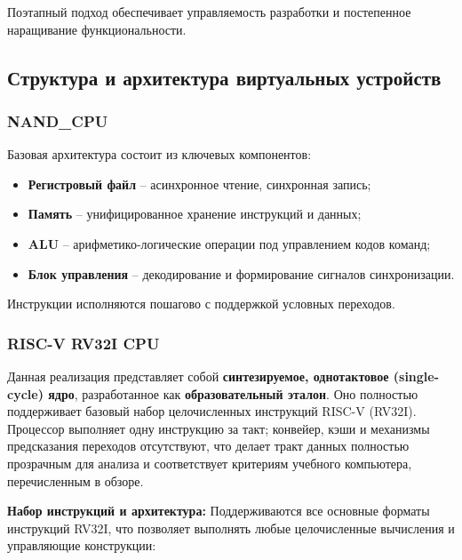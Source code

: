 Поэтапный подход обеспечивает управляемость разработки и постепенное наращивание функциональности.

\subsection{Структура и архитектура виртуальных устройств}

\subsubsection{NAND\_CPU}
Базовая архитектура состоит из ключевых компонентов:
\begin{itemize}
  \item \textbf{Регистровый файл} -- асинхронное чтение, синхронная запись;
  \item \textbf{Память} -- унифицированное хранение инструкций и данных;
  \item \textbf{ALU} -- арифметико-логические операции под управлением кодов команд;
  \item \textbf{Блок управления} -- декодирование и формирование сигналов синхронизации.
\end{itemize}

Инструкции исполняются пошагово с поддержкой условных переходов.

\subsubsection{RISC-V RV32I CPU}
Данная реализация представляет собой \textbf{синтезируемое, однотактовое (single-cycle) ядро}, разработанное как \textbf{образовательный эталон}. Оно полностью поддерживает базовый набор целочисленных инструкций RISC-V (RV32I). Процессор выполняет одну инструкцию за такт; конвейер, кэши и механизмы предсказания переходов отсутствуют, что делает тракт данных полностью прозрачным для анализа и соответствует критериям учебного компьютера, перечисленным в обзоре.

\textbf{Набор инструкций и архитектура:}
Поддерживаются все основные форматы инструкций RV32I, что позволяет выполнять любые целочисленные вычисления и управляющие конструкции:

